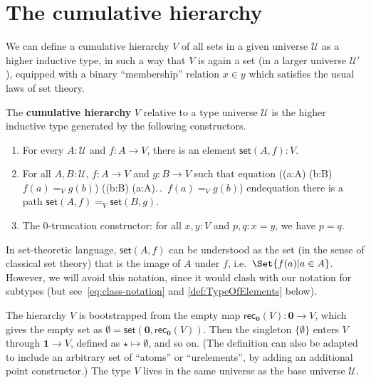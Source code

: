 \documentclass[10pt,a4paper]{article}
\makeatletter
\providecommand{\index}[1]{}
\newcommand{\define}[1]{\textbf{#1}}
\def\fall#1{\forall (#1)\@ifnextchar\bgroup{.\,\fall}{.\,}}
\def\exis#1{\exists (#1)\@ifnextchar\bgroup{.\,\exis}{.\,}}
\let\setof\Set    %
\newcommand{\rec}[1]{\mathsf{rec}_{#1}}
\newcommand{\id}[3][]{\ensuremath{#2 =_{#1} #3}\xspace}
\newcommand{\UU}{\ensuremath{\mathcal{U}}\xspace}
\newcommand{\emptyt}{\ensuremath{\mathbf{0}}\xspace}
\newcommand{\unit}{\ensuremath{\mathbf{1}}\xspace}
\newcommand{\ttt}{\ensuremath{\star}\xspace}
\newcommand{\vset}{\mathsf{set}}  %
\theoremstyle{definition}
\theoremstyle{remark}
\numberwithin{equation}{section}
\newcommand{\indexdef}[1]{\index{#1|defstyle}}   %
\newcommand{\narrowbreak}{}
\newenvironment{narrowmultline}{\csname equation\endcsname}{\csname endequation\endcsname}
\makeatother
\begin{document}
\section{The cumulative hierarchy}
\label{sec:cumulative-hierarchy}

\index{bargaining|(}%
We can define a cumulative hierarchy $V$ of all sets in a given universe $\UU$ as a higher inductive type, in such a way that $V$ is again a set (in a larger universe $\UU'$), equipped with a binary ``membership'' relation $x\in y$ which satisfies the usual laws of set theory.

\begin{defn}\label{defn:V}
  The \define{cumulative hierarchy}
  \indexdef{cumulative!hierarchy, set-theoretic}%
  \indexdef{hierarchy!cumulative, set-theoretic}%
  $V$ relative to a type universe $\UU$ is the
  higher inductive type generated by the following constructors.
  \begin{enumerate}
  \item For every $A : \UU$ and $f : A \to V$, there is an element $\vset(A, f) : V$.
  \item For all $A, B : \UU$, $f : A \to V$ and $g : B \to V$ such that
    \begin{narrowmultline} \label{eq:V-path}
      \big(\fall{a:A} \exis{b:B} \id[V]{f(a)}{g(b)}\big) \land \narrowbreak
      \big(\fall{b:B} \exis{a:A} \id[V]{f(a)}{g(b)}\big)
    \end{narrowmultline}
    there is a path $\id[V]{\vset(A,f)}{\vset(B,g)}$.
  \item The 0-truncation constructor: for all $x,y:V$ and $p,q:x=y$, we have $p=q$.
  \end{enumerate}
\end{defn}

In set-theoretic language, $\vset(A,f)$ can be understood as the set (in the sense of classical set theory) that is the image of $A$ under $f$, i.e.\ $\setof{ f(a) | a \in A }$.
However, we will avoid this notation, since it would clash with our notation for subtypes (but see~\eqref{eq:class-notation} and \cref{def:TypeOfElements} below).

The hierarchy $V$ is
bootstrapped from the empty map $\rec\emptyt(V) : \emptyt \to V$, which gives the empty set as $\emptyset = \vset(\emptyt,\rec\emptyt(V))$.
Then the singleton $\{\emptyset\}$ enters $V$ through $\unit \to V$, defined as $\ttt \mapsto \emptyset$, and so
on.
(The definition can also be adapted to include an arbitrary set of ``atoms'' or ``urelements'', by adding an additional point constructor.)
The type $V$ lives in the same universe as the base universe $\UU$.
\end{document}

